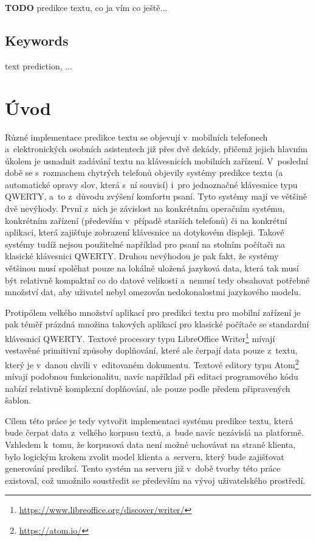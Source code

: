 \documentclass[a4paper,11pt,openany]{book} %
\begin{document}
{\bf TODO} predikce textu, co ja vím co ještě... 

\section*{Keywords}

text prediction, ...

\clearpage

\tableofcontents

\clearpage


\chapter*{Úvod}

Různé implementace predikce textu se objevují v~mobilních telefonech a~elektronických osobních asistentech již přes dvě dekády, přičemž jejich hlavním úkolem je usnadnit zadávání textu na klávesnicích mobilních zařízení. V~poslední době se s~rozmachem chytrých telefonů objevily systémy predikce textu (a automatické opravy slov, která s~ní souvisí) i~pro jednoznačné klávesnice typu QWERTY, a~to z~důvodu zvýšení komfortu psaní. Tyto systémy mají ve většině dvě nevýhody. První z~nich je závislost na konkrétním operačním systému, konkrétním zařízení (především v~případě starších telefonů) či na konkrétní aplikaci, která zajišťuje zobrazení klávesnice na dotykovém displeji. Takové systémy tudíž nejsou použitelné například pro psaní na stolním počítači na klasické klávesnici QWERTY. Druhou nevýhodou je pak fakt, že systémy většinou musí spoléhat pouze na lokálně uložená jazyková data, která tak musí být relativně kompaktní co do datové velikosti a~nemusí tedy obsahovat potřebné množství dat, aby uživatel nebyl omezován nedokonalostmi jazykového modelu.

Protipólem velkého množství aplikací pro predikci textu pro mobilní zařízení je pak téměř prázdná množina takových aplikací pro klasické počítače se standardní klávesnicí QWERTY. Textové procesory typu LibreOffice Writer\footnote{\url{https://www.libreoffice.org/discover/writer/}} mívají vestavěné primitivní způsoby doplňování, které ale čerpají data pouze z~textu, který je v~danou chvíli v~editovaném dokumentu. Textové editory typu Atom\footnote{\url{https://atom.io/}} mívají podobnou funkcionalitu, navíc například při editaci programového kódu nabízí relativně komplexní doplňování, ale pouze podle předem připravených šablon.

Cílem této práce je tedy vytvořit implementaci systému predikce textu, která bude čerpat data z~velkého korpusu textů, a~bude navíc nezávislá na platformě. Vzhledem k~tomu, že korpusová data není možné uchovávat na straně klienta, bylo logickým krokem zvolit model klienta a~serveru, který bude zajišťovat generování predikcí. Tento systém na serveru již v~době tvorby této práce existoval, což umožnilo soustředit se především na vývoj uživatelského prostředí. 
\end{document}
